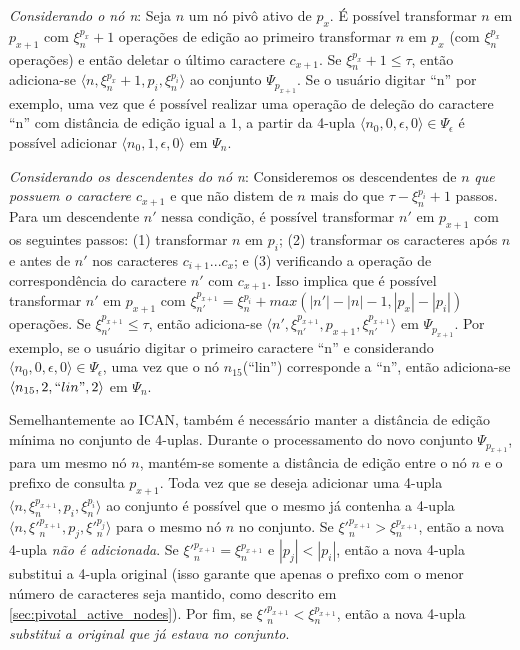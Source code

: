 \textit{Considerando o nó n}: Seja $n$ um nó pivô ativo de $p_{x}$. É possível transformar $n$ em $p_{x+1}$ com $\xi_{n}^{p_{x}} + 1$ operações de edição ao primeiro transformar $n$ em $p_{x}$ (com $\xi_{n}^{p_{x}}$ operações) e então deletar o último caractere $c_{x+1}$. Se $\xi_{n}^{p_{x}} + 1 \leq \tau$, então adiciona-se $\langle n, \xi_{n}^{p_{x}} + 1, p_{i}, \xi_{n}^{p_{i}} \rangle$ ao conjunto $\Psi_{p_{x+1}}$. Se o usuário digitar ``n'' por exemplo, uma vez que é possível realizar uma operação de deleção do caractere ``n'' com distância de edição igual a $1$, a partir da 4-upla $\langle n_{0}, 0, \epsilon, 0 \rangle \in \Psi_{\epsilon}$ é possível adicionar $\langle n_{0}, 1, \epsilon, 0 \rangle$ em $\Psi_{n}$.

\textit{Considerando os descendentes do nó n}: Consideremos os descendentes de $n$ \textit{que possuem o caractere $c_{x+1}$} e que não distem de $n$ mais do que $\tau - \xi_{n}^{p_{i}} + 1$ passos. Para um descendente $n'$ nessa condição, é possível transformar $n'$ em $p_{x+1}$ com os seguintes passos: (1) transformar $n$ em $p_{i}$; (2) transformar os caracteres após $n$ e antes de $n'$ nos caracteres $c_{i+1}...c_{x}$; e (3) verificando a operação de correspondência do caractere $n'$ com $c_{x+1}$. Isso implica que é possível transformar $n'$ em $p_{x+1}$ com $\xi_{n'}^{p_{x+1}} = \xi_{n}^{p_{i}} + max(|n'| - |n| - 1, |p_{x}| - |p_{i}|)$ operações. Se $\xi_{n'}^{p_{x+1}} \leq \tau$, então adiciona-se $\langle n', \xi_{n'}^{p_{x+1}}, p_{x+1}, \xi_{n'}^{p_{x+1}} \rangle$ em $\Psi_{p_{x+1}}$. Por exemplo, se o usuário digitar o primeiro caractere ``n'' e considerando $\langle n_{0}, 0, \epsilon, 0 \rangle \in \Psi_{\epsilon}$, uma vez que o nó $n_{15}$(``lin'') corresponde a ``n'', então adiciona-se $\langle n_{15}, 2, ``lin", 2 \rangle$ em $\Psi_{n}$.

Semelhantemente ao ICAN, também é necessário manter a distância de edição mínima no conjunto de 4-uplas. Durante o processamento do novo conjunto $\Psi_{p_{x+1}}$, para um mesmo nó $n$, mantém-se somente a distância de edição entre o nó $n$ e o prefixo de consulta $p_{x+1}$. Toda vez que se deseja adicionar uma 4-upla $\langle n, \xi_{n}^{p_{x + 1}}, p_{i}, \xi_{n}^{p_{i}} \rangle$ ao conjunto é possível que o mesmo já contenha a 4-upla $\langle n, {\xi'}_{n}^{p_{x + 1}}, p_{j}, {\xi'}_{n}^{p_{j}} \rangle$ para o mesmo nó $n$ no conjunto. Se ${\xi'}_{n}^{p_{x+1}} > \xi_{n}^{p_{x+1}}$, então a nova 4-upla \textit{não é adicionada}. Se ${\xi'}_{n}^{p_{x+1}} = \xi_{n}^{p_{x+1}}$ e $|p_{j}| < |p_{i}|$, então a nova 4-upla substitui a 4-upla original (isso garante que apenas o prefixo com o menor número de caracteres seja mantido, como descrito em \ref{sec:pivotal_active_nodes}). Por fim, se ${\xi'}_{n}^{p_{x+1}} < \xi_{n}^{p_{x+1}}$, então a nova 4-upla \textit{substitui a original que já estava no conjunto}.

